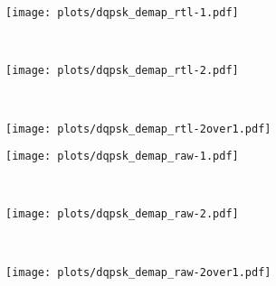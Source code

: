\documentclass[class=report,11pt,crop=false]{standalone}
\begin{document}
\begin{figure}[htbp]
  \centering
  \begin{subfigure}[t]{0.3\textwidth}
    \centering
    \captionsetup{type=figure}
    \texttt{[image: plots/dqpsk\_demap\_rtl-1.pdf]}
    \caption{}
    \label{fig:dqpsk_demap_rtl-1}
  \end{subfigure}%
  ~ 
  \begin{subfigure}[t]{0.3\textwidth}
    \centering
    \captionsetup{type=figure}
    \texttt{[image: plots/dqpsk\_demap\_rtl-2.pdf]}
    \caption{}
    \label{fig:dqpsk_demap_rtl-2}
  \end{subfigure}
  ~ 
  \begin{subfigure}[t]{0.3\textwidth}
    \centering
    \captionsetup{type=figure}
    \texttt{[image: plots/dqpsk\_demap\_rtl-2over1.pdf]}
    \caption{}
    \label{fig:dqpsk_demap_rtl-2over1}
  \end{subfigure}
  \caption{}
  \label{fig:dqpsk_demap_rtl}
\end{figure}


\begin{figure}[htbp]
  \centering
  \begin{subfigure}[t]{0.3\textwidth}
    \centering
    \captionsetup{type=figure}
    \texttt{[image: plots/dqpsk\_demap\_raw-1.pdf]}
    \caption{}
    \label{fig:dqpsk_demap_rtl-1}
  \end{subfigure}%
  ~ 
  \begin{subfigure}[t]{0.3\textwidth}
    \centering
    \captionsetup{type=figure}
    \texttt{[image: plots/dqpsk\_demap\_raw-2.pdf]}
    \caption{}
    \label{fig:dqpsk_demap_rtl-2}
  \end{subfigure}
  ~ 
  \begin{subfigure}[t]{0.3\textwidth}
    \centering
    \captionsetup{type=figure}
    \texttt{[image: plots/dqpsk\_demap\_raw-2over1.pdf]}
    \caption{}
    \label{fig:dqpsk_demap_raw-2over1}
  \end{subfigure}
  \caption{}
  \label{fig:dqpsk_demap_raw}
\end{figure}

\begin{figure}[htbp]
  \centering
  \captionsetup{type=figure}
  \def\svgwidth{\linewidth}
  { %
      }
  \caption{}
  \label{fig:dqpsk_demap}
\end{figure}
\end{document}
